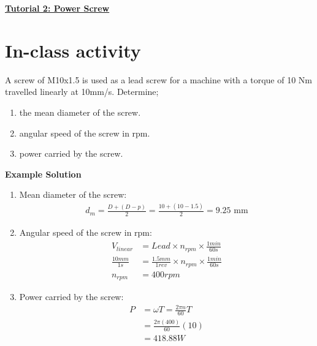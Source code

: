 \documentclass[a4paper, fleqn]{article}
\begin{document}
\underline{\textbf{\large Tutorial 2: Power Screw}}
\vspace{10pt}

\section*{In-class activity}

A screw of M10x1.5 is used as a lead screw for a machine with a torque of 10 Nm travelled linearly at 10mm/s. Determine;
\begin{enumerate}[label=(\roman*)]
    \item the mean diameter of the screw.
    \item angular speed of the screw in rpm.
    \item power carried by the screw.
\end{enumerate}

\textbf{Example Solution}

\begin{enumerate}[label=(\roman*)]
    \item Mean diameter of the screw:
    \begin{equation*}
        \begin{aligned}
        d_m = \frac{D + (D - p)}{2} = \frac{10 + (10 - 1.5)}{2} = 9.25 \text{ mm}
        \end{aligned}
    \end{equation*}

    \item Angular speed of the screw in rpm:
    \begin{equation*}
        \begin{aligned}
        V_{linear} &=Lead \times n_{rpm} \times \frac {1 min}{60 s} \\
        \frac {10mm}{1s} &=\frac {1.5mm}{1 rev} \times n_{rpm} \times \frac {1 min}{60 s} \\
        n_{rpm} &= 400rpm
        \end{aligned}
    \end{equation*}

    \item Power carried by the screw:
    \begin{equation*}
        \begin{aligned}
        P &= \omega T=  \frac{2\pi n}{60} T\\
        &= \frac{2\pi (400)}{60} (10)\\
        &= 418.88 W
        \end{aligned}
    \end{equation*}
\end{enumerate}
\end{document}

